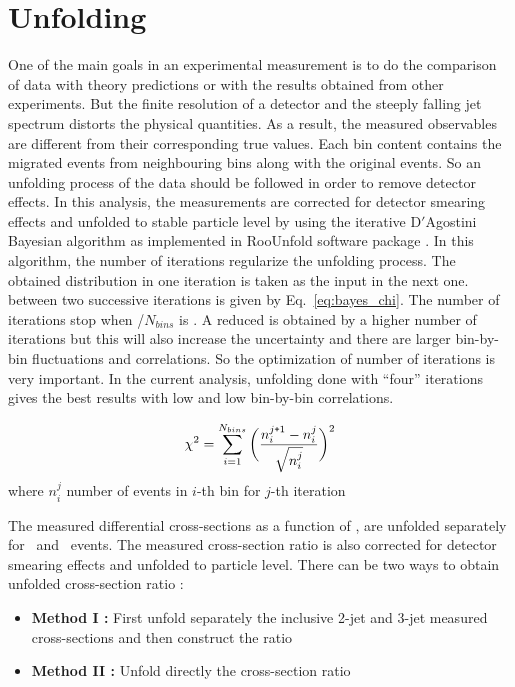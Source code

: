 \section{Unfolding}
\label{sec:unfolding}
One of the main goals in an experimental measurement is to do the comparison of data with theory predictions or with the results obtained from other experiments. But the finite resolution of a detector and the steeply falling jet \pt spectrum distorts the physical quantities. As a result, the measured observables are different from their corresponding true values. Each \pt bin content contains the migrated events from neighbouring bins along with the original events. So an unfolding process of the data should be followed in order to remove detector effects. In this analysis, the measurements are corrected for detector smearing effects and unfolded to stable particle level by using the iterative D$'$Agostini Bayesian algorithm \cite{DAgostini:1994fjx,DAgostini} as implemented in RooUnfold software package \cite{Adye:2011gm}. In this algorithm, the number of iterations regularize the unfolding process. The obtained distribution in one iteration is taken as the input in the next one. \chisq between two successive iterations is given by Eq.~\ref{eq:bayes_chi}. The number of iterations stop when \chisq/$N_{bins}$ is . A reduced \chisq is obtained by a higher number of iterations but this will also increase the uncertainty and there are larger bin-by-bin fluctuations and correlations. So the optimization of number of iterations is very important. In the current analysis, unfolding done with ``four'' iterations gives the best results with low \chisq and low bin-by-bin correlations.

\begin{equation}
\label{eq:bayes_chi}
\chisq = \sum\limits_{i=1}^{N_{bins}}\bigg(\frac{n^{j\texttt{+}1}_{i} - n^{j}_{i}}{\sqrt{n^{j}_{i}}}\bigg)^{2}
\end{equation} 
where $n^{j}_{i}$ number of events in $i$-th bin for $j$-th iteration  

The measured differential cross-sections as a function of \httwo, are unfolded separately for \njt~and \njth~events. The measured cross-section ratio \ratio is also corrected for detector smearing effects and unfolded to particle level. There can be two ways to obtain unfolded cross-section ratio :

\begin{itemize}
\item {\bf Method I :} First unfold separately the inclusive 2-jet and 3-jet measured cross-sections and then construct the ratio \ratio 
\item {\bf Method II :} Unfold directly the cross-section ratio \ratio
\end{itemize}

